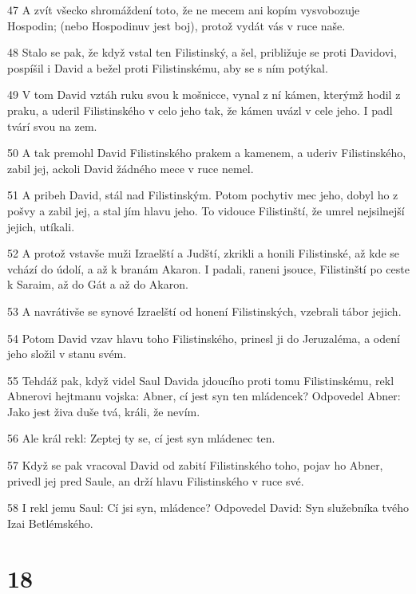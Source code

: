 \par 47 A zvít všecko shromáždení toto, že ne mecem ani kopím vysvobozuje Hospodin; (nebo Hospodinuv jest boj), protož vydát vás v ruce naše.
\par 48 Stalo se pak, že když vstal ten Filistinský, a šel, približuje se proti Davidovi, pospíšil i David a bežel proti Filistinskému, aby se s ním potýkal.
\par 49 V tom David vztáh ruku svou k mošnicce, vynal z ní kámen, kterýmž hodil z praku, a uderil Filistinského v celo jeho tak, že kámen uvázl v cele jeho. I padl tvárí svou na zem.
\par 50 A tak premohl David Filistinského prakem a kamenem, a uderiv Filistinského, zabil jej, ackoli David žádného mece v ruce nemel.
\par 51 A pribeh David, stál nad Filistinským. Potom pochytiv mec jeho, dobyl ho z pošvy a zabil jej, a stal jím hlavu jeho. To vidouce Filistinští, že umrel nejsilnejší jejich, utíkali.
\par 52 A protož vstavše muži Izraelští a Judští, zkrikli a honili Filistinské, až kde se vchází do údolí, a až k branám Akaron. I padali, raneni jsouce, Filistinští po ceste k Saraim, až do Gát a až do Akaron.
\par 53 A navrátivše se synové Izraelští od honení Filistinských, vzebrali tábor jejich.
\par 54 Potom David vzav hlavu toho Filistinského, prinesl ji do Jeruzaléma, a odení jeho složil v stanu svém.
\par 55 Tehdáž pak, když videl Saul Davida jdoucího proti tomu Filistinskému, rekl Abnerovi hejtmanu vojska: Abner, cí jest syn ten mládencek? Odpovedel Abner: Jako jest živa duše tvá, králi, že nevím.
\par 56 Ale král rekl: Zeptej ty se, cí jest syn mládenec ten.
\par 57 Když se pak vracoval David od zabití Filistinského toho, pojav ho Abner, privedl jej pred Saule, an drží hlavu Filistinského v ruce své.
\par 58 I rekl jemu Saul: Cí jsi syn, mládence? Odpovedel David: Syn služebníka tvého Izai Betlémského.

\chapter{18}

